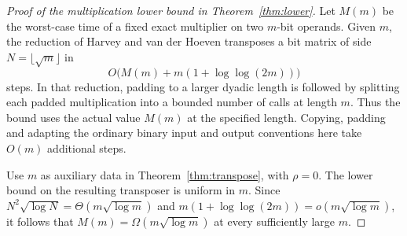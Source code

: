 \begin{proof}[Proof of the multiplication lower bound in Theorem~\ref{thm:lower}]
Let $M(m)$ be the worst-case time of a fixed exact multiplier on two
$m$-bit operands. Given $m$, the reduction of Harvey and van der Hoeven
\cite[full version, Corollaries~6.2 and~6.3]{hvhtranspose} transposes
a bit matrix of side $N=\lfloor\sqrt m\rfloor$ in
\[
                O\bigl(M(m)+m(1+\log\log(2m))\bigr)
\]
steps. In that reduction, padding to a larger dyadic length is followed
by splitting each padded multiplication into a bounded number of calls
at length $m$. Thus the bound uses the actual value $M(m)$ at the
specified length. Copying, padding and adapting the ordinary binary
input and output conventions here take $O(m)$ additional steps.

Use $m$ as auxiliary data in Theorem~\ref{thm:transpose}, with
$\rho=0$. The lower bound on the resulting transposer is uniform in
$m$. Since $N^2\sqrt{\log N}=\Theta(m\sqrt{\log m})$ and
$m(1+\log\log(2m))=o(m\sqrt{\log m})$, it follows that
$M(m)=\Omega(m\sqrt{\log m})$ at every sufficiently large $m$.
\end{proof}
